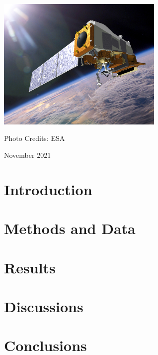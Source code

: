 \documentclass{physics_article_B}
\begin{document}
\begin{titlepage}
	\vspace{0.5\baselineskip} %
	
	
	\vspace{1.0cm}
	\centering
	\includegraphics[width = 80mm]{img_press_140106_suomi-npp.jpg}
	
	{Photo Credits: ESA}
	
	
	
	
	\vspace{1cm} %
	
	
	
	\vspace{1cm}
	
	November 2021

\end{titlepage}


\tableofcontents


\newpage

\begin{abstract}

\end{abstract}



\section{Introduction}



\section{Methods and Data}

 

\section{Results}



\section{Discussions}



\section{Conclusions}



\newpage


\end{document}
